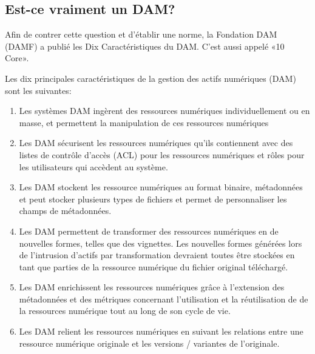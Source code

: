 \subsection{Est-ce vraiment un DAM?}
Afin de contrer cette question et d'établir une norme, la Fondation DAM (DAMF) a publié les Dix Caractéristiques du DAM. C'est aussi appelé «10 Core».

Les dix principales caractéristiques de la gestion des actifs numériques (DAM) sont les suivantes:
\newline

\begin{enumerate}
\item Les systèmes DAM ingèrent des ressources numériques individuellement ou en masse, et permettent la manipulation de ces ressources numériques
\newline

\item Les DAM sécurisent les ressources numériques qu'ils contiennent avec des listes de contrôle d'accès (ACL) pour les ressources numériques et rôles pour les utilisateurs qui accèdent au système.
 \newline

\item Les DAM stockent les ressource numériques au format binaire, métadonnées et peut stocker plusieurs types de fichiers et permet de personnaliser les champs de métadonnées. 
\newline
 
\item Les DAM permettent de transformer des ressources numériques en de nouvelles formes, telles que des vignettes. Les nouvelles formes générées lors de l'intrusion d'actifs par transformation devraient toutes être stockées en tant que parties de la ressource numérique du fichier original téléchargé.
\newline


\item Les DAM enrichissent les ressources numériques grâce à l'extension des métadonnées et des métriques concernant l'utilisation et la réutilisation de de la ressources numérique tout au long de son cycle de vie.
\newline

\item Les DAM relient les ressources numériques en suivant les relations entre une ressource numérique originale et les versions / variantes de l'originale.
\newline



\end{enumerate}
